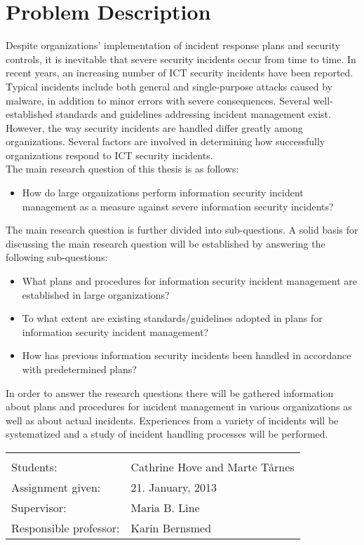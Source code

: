 \chapter*{Problem Description}
Despite organizations’ implementation of incident response plans and security controls, it is inevitable that severe security incidents occur from time to time. In recent years, an increasing number of ICT security incidents have been reported. Typical incidents include both general and single-purpose attacks caused by malware, in addition to minor errors with severe consequences. Several well-established standards and guidelines addressing incident management exist. However, the way security incidents are handled differ greatly among organizations. Several factors are involved in determining how successfully organizations respond to ICT security incidents. \\

The main research question of this thesis is as follows: 
\begin{itemize}
\item How do large organizations perform information security incident management as a measure against severe information security incidents?\\
\end{itemize}

The main research question is further divided into sub-questions. A solid basis for discussing the main research question will be established by answering the following sub-questions:

\begin{itemize}
\item What plans and procedures for information security incident management are established in large organizations?
\item To what extent are existing standards/guidelines adopted in plans for information security incident management?
\item How has previous information security incidents been handled in accordance with predetermined plans? 
\end{itemize}

In order to answer the research questions there will be gathered information about plans and procedures for incident management in various organizations as well as about actual incidents. Experiences from a variety of incidents will be systematized and a study of incident handling processes will be performed.

\begin{tabular}{@{}p{4cm}l}
\vspace{0.4cm} & \vspace{0.4cm} \\
Students:		& Cathrine Hove and Marte T\aa rnes \\
Assignment given: & 21. January, 2013 \\
Supervisor:		& Maria B. Line \\
Responsible professor: 	& Karin Bernsmed \\
\end{tabular}